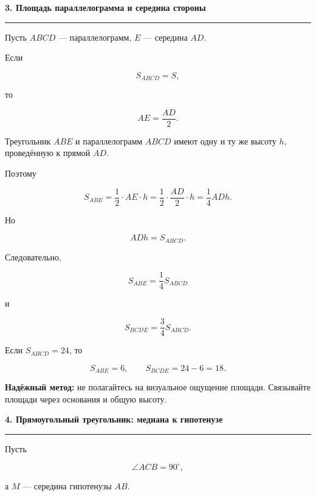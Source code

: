 \documentclass[a4paper,12pt]{article}
\newcommand{\topic}[1]{%
  \vspace{0.8em}
  {\Large\bfseries\textcolor{darkaccent}{#1}}\par
  \vspace{0.25em}
  {\color{accent}\rule{\linewidth}{0.6pt}}
  \vspace{0.45em}
}
\newcommand{\key}[1]{\textcolor{darkaccent}{\textbf{#1}}}
\begin{document}

\topic{3. Площадь параллелограмма и середина стороны}

Пусть \(ABCD\) --- параллелограмм, \(E\) --- середина \(AD\).

\begin{center}
\end{center}

Если

\[
S_{ABCD}=S,
\]

то

\[
AE=\frac{AD}{2}.
\]

Треугольник \(ABE\) и параллелограмм \(ABCD\) имеют одну и ту же высоту \(h\), проведённую к прямой \(AD\).

Поэтому

\[
S_{ABE}
=
\frac12\cdot AE\cdot h
=
\frac12\cdot\frac{AD}{2}\cdot h
=
\frac14 ADh.
\]

Но

\[
ADh=S_{ABCD}.
\]

Следовательно,

\[
\boxed{
S_{ABE}=\frac14S_{ABCD}
}
\]

и

\[
\boxed{
S_{BCDE}=\frac34S_{ABCD}.
}
\]

Если \(S_{ABCD}=24\), то

\[
S_{ABE}=6,
\qquad
S_{BCDE}=24-6=18.
\]

\key{Надёжный метод:}
не полагайтесь на визуальное ощущение площади. Связывайте площади через основания и общую высоту.


\topic{4. Прямоугольный треугольник: медиана к гипотенузе}

Пусть

\[
\angle ACB=90^\circ,
\]

а \(M\) --- середина гипотенузы \(AB\).
\end{document}
